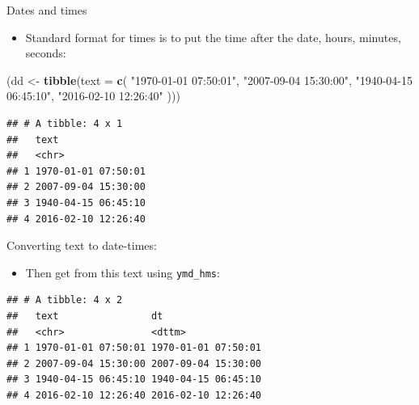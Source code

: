 \documentclass[
  ignorenonframetext,
]{beamer}
\newenvironment{Shaded}{\begin{snugshade}}{\end{snugshade}}
\newcommand{\DataTypeTok}[1]{\textcolor[rgb]{0.13,0.29,0.53}{#1}}
\newcommand{\KeywordTok}[1]{\textcolor[rgb]{0.13,0.29,0.53}{\textbf{#1}}}
\newcommand{\NormalTok}[1]{#1}
\newcommand{\OperatorTok}[1]{\textcolor[rgb]{0.81,0.36,0.00}{\textbf{#1}}}
\newcommand{\StringTok}[1]{\textcolor[rgb]{0.31,0.60,0.02}{#1}}
\providecommand{\tightlist}{%
  \setlength{\itemsep}{0pt}\setlength{\parskip}{0pt}}
\begin{document}
\begin{frame}[fragile]{Dates and times}
\protect\hypertarget{dates-and-times-1}{}

\begin{itemize}
\tightlist
\item
  Standard format for times is to put the time after the date, hours,
  minutes, seconds:
\end{itemize}

\begin{Shaded}
\begin{Highlighting}[]
\NormalTok{(dd <-}\StringTok{ }\KeywordTok{tibble}\NormalTok{(}\DataTypeTok{text =} \KeywordTok{c}\NormalTok{(}
  \StringTok{"1970-01-01 07:50:01"}\NormalTok{, }\StringTok{"2007-09-04 15:30:00"}\NormalTok{,}
  \StringTok{"1940-04-15 06:45:10"}\NormalTok{, }\StringTok{"2016-02-10 12:26:40"}
\NormalTok{)))}
\end{Highlighting}
\end{Shaded}

\begin{verbatim}
## # A tibble: 4 x 1
##   text               
##   <chr>              
## 1 1970-01-01 07:50:01
## 2 2007-09-04 15:30:00
## 3 1940-04-15 06:45:10
## 4 2016-02-10 12:26:40
\end{verbatim}

\end{frame}

\begin{frame}[fragile]{Converting text to date-times:}
\protect\hypertarget{converting-text-to-date-times}{}

\begin{itemize}
\tightlist
\item
  Then get from this text using \texttt{ymd\_hms}:
\end{itemize}

\begin{Shaded}
\end{Shaded}

\begin{verbatim}
## # A tibble: 4 x 2
##   text                dt                 
##   <chr>               <dttm>             
## 1 1970-01-01 07:50:01 1970-01-01 07:50:01
## 2 2007-09-04 15:30:00 2007-09-04 15:30:00
## 3 1940-04-15 06:45:10 1940-04-15 06:45:10
## 4 2016-02-10 12:26:40 2016-02-10 12:26:40
\end{verbatim}

\end{frame}
\end{document}
